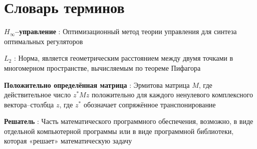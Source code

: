 \chapter*{Словарь терминов}             %

\textbf{\(H_\infty\)--управление } : Оптимизационный метод теории управления для синтеза оптимальных регуляторов

\textbf{\(L_2\)} : Норма, является геометрическим расстоянием между двумя точками в многомерном пространстве, вычисляемым по теореме Пифагора

\textbf{Положительно определённая матрица} : Эрмитова матрица $M$, где действительное число $z^* M z$ положительно для каждого ненулевого комплексного вектора--столбца $z$, где $z^*$ обозначает сопряжённое транспонирование

\textbf{Решатель} : Часть математического программного обеспечения, возможно, в виде отдельной компьютерной программы или в виде программной библиотеки, которая «решает» математическую задачу